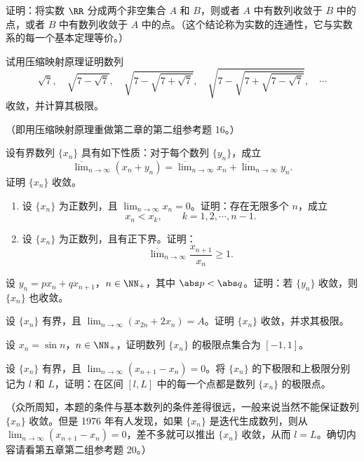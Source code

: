 \begin{xreferenceproblem}[3]
证明：将实数 $\RR$ 分成两个非空集合 $A$ 和 $B$，则或者 $A$ 中有数列收敛于 $B$ 中的点，或者 $B$ 中有数列收敛于 $A$ 中的点。（这个结论称为实数的连通性，它与实数系的每一个基本定理等价。）
\end{xreferenceproblem}

\begin{xreferenceproblem}[4]
试用压缩映射原理证明数列
  \[
    \sqrt7,\quad
    \sqrt{7-\sqrt7},\quad
    \sqrt{7-\sqrt{7+\sqrt7}},\quad
    \sqrt{7-\sqrt{7+\sqrt{7-\sqrt7}}},\quad\cdots
  \]
  收敛，并计算其极限。

  （即用压缩映射原理重做第二章的第二组参考题 16。）
\end{xreferenceproblem}

\begin{xreferenceproblem}[5]
设有界数列 $\{x_n\}$ 具有如下性质：对于每个数列 $\{y_n\}$，成立
  \[
    \overline{\lim}_{n\to\infty}(x_n+y_n)
    =\overline{\lim}_{n\to\infty}x_n+\overline{\lim}_{n\to\infty}y_n.
  \]
  证明 $\{x_n\}$ 收敛。
\end{xreferenceproblem}

\begin{xreferenceproblem}[6]
\begin{enumerate}[label=(\arabic*)]
    \item 设 $\{x_n\}$ 为正数列，且 $\lim_{n\to\infty}x_n=0$。证明：存在无限多个 $n$，成立
    \[
      x_n<x_k,\qquad k=1,2,\cdots,n-1.
    \]
    \item 设 $\{x_n\}$ 为正数列，且有正下界。证明：
    \[
      \overline{\lim}_{n\to\infty}\frac{x_{n+1}}{x_n}\geqslant1.
    \]
  \end{enumerate}
\end{xreferenceproblem}

\begin{xreferenceproblem}[7]
设 $y_n=px_n+qx_{n+1}$，$n\in\NN_+$，其中 $\abs p<\abs q$。证明：若 $\{y_n\}$ 收敛，则 $\{x_n\}$ 也收敛。
\end{xreferenceproblem}

\begin{xreferenceproblem}[8]
设 $\{x_n\}$ 有界，且 $\lim_{n\to\infty}(x_{2n}+2x_n)=A$。证明 $\{x_n\}$ 收敛，并求其极限。
\end{xreferenceproblem}

\begin{xreferenceproblem}[9]
设 $x_n=\sin n$，$n\in\NN_+$，证明数列 $\{x_n\}$ 的极限点集合为 $[-1,1]$。
\end{xreferenceproblem}

\begin{xreferenceproblem}[10]
设 $\{x_n\}$ 有界，且 $\lim_{n\to\infty}(x_{n+1}-x_n)=0$。将 $\{x_n\}$ 的下极限和上极限分别记为 $l$ 和 $L$，证明：在区间 $[l,L]$ 中的每一个点都是数列 $\{x_n\}$ 的极限点。

  （众所周知，本题的条件与基本数列的条件差得很远，一般来说当然不能保证数列 $\{x_n\}$ 收敛。但是 1976 年有人发现，如果 $\{x_n\}$ 是迭代生成数列，则从 $\lim_{n\to\infty}(x_{n+1}-x_n)=0$，差不多就可以推出 $\{x_n\}$ 收敛，从而 $l=L$。确切内容请看第五章第二组参考题 20。）
\end{xreferenceproblem}
